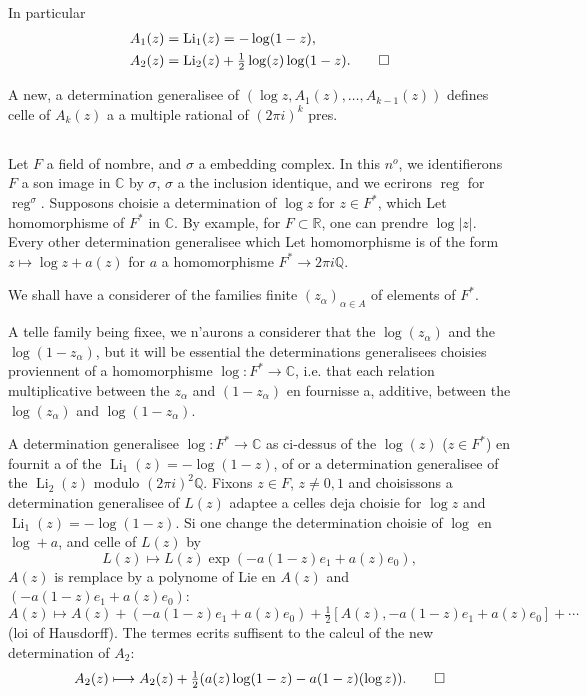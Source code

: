\documentclass[12pt,a4paper]{article}
\theoremstyle{plain}
\theoremstyle{definition}
\theoremstyle{remark}
\DeclareMathOperator{\reg}{reg}
\newcommand{\Q}{\mathbb{Q}}
\newcommand{\R}{\mathbb{R}}
\newcommand{\C}{\mathbb{C}}
\begin{document}
{{In particular
\begin{align*}
A_1(z) &= \operatorname{Li}_1(z) = -\log(1-z),\\
A_2(z) &= \operatorname{Li}_2(z) + \tfrac{1}{2}\log(z)\log(1-z).\qedhere
\end{align*}

A new, a determination generalisee of $(\log z,A_1(z),\ldots,A_{k-1}(z))$ defines celle of $A_k(z)$ {a} a multiple rational of $(2\pi i)^k$ pres.

\subsection{}

Let $F$ a field of nombre, and $\sigma$ a embedding complex. In this $n^o$, we identifierons $F$ {a} son image in $\C$ by $\sigma$, $\sigma$ {a} the inclusion identique, and we ecrirons $\reg$ for $\reg^\sigma$. Supposons choisie a determination of $\log z$ for $z\in F^*$, which Let homomorphisme of $F^*$ in $\C$. By example, for $F\subset\R$, one can prendre $\log|z|$. Every other determination generalisee which Let homomorphisme is of the form $z\mapsto\log z+a(z)$ for $a$ a homomorphisme $F^*\to 2\pi i\Q$.

We shall have {a} considerer of the families finite $(z_\alpha)_{\alpha\in A}$ of elements of $F^*$.

A telle family being fixee, we n'aurons {a} considerer that the $\log(z_\alpha)$ and the $\log(1-z_\alpha)$, but it will be essential the determinations generalisees choisies proviennent of a homomorphisme $\log:F^*\to\C$, i.e. that each relation multiplicative between the $z_\alpha$ and $(1-z_\alpha)$ en fournisse a, additive, between the $\log(z_\alpha)$ and $\log(1-z_\alpha)$.

A determination generalisee $\log:F^*\to\C$ as ci-dessus of the $\log(z)$ ($z\in F^*$) en fournit a of the $\operatorname{Li}_1(z)=-\log(1-z)$, of or a determination generalisee of the $\operatorname{Li}_2(z)$ modulo $(2\pi i)^2\Q$. Fixons $z\in F$, $z\neq 0,1$ and choisissons a determination generalisee of $L(z)$ adaptee {a} celles deja choisie for $\log z$ and $\operatorname{Li}_1(z)=-\log(1-z)$. Si one change the determination choisie of $\log$ en $\log+a$, and celle of $L(z)$ by
\begin{equation}\label{eq:4.2.1}
L(z) \longmapsto L(z)\exp(-a(1-z)e_1+a(z)e_0),\tag{4.2.1}
\end{equation}
$A(z)$ is remplace by a polynome of Lie en $A(z)$ and $(-a(1-z)e_1+a(z)e_0)$:
\begin{equation}\label{eq:4.2.2}
A(z) \longmapsto A(z) + (-a(1-z)e_1+a(z)e_0) + \tfrac{1}{2}[A(z),-a(1-z)e_1+a(z)e_0]+\cdots
\tag{4.2.2}
\end{equation}
(loi of Hausdorff). The termes ecrits suffisent to the calcul of the new determination of $A_2$:
\begin{equation*}
A_2(z) \longmapsto A_2(z) + \tfrac{1}{2}(a(z)\log(1-z)-a(1-z)(\log z)).\qedhere
\end{equation*}

}}
\end{document}
